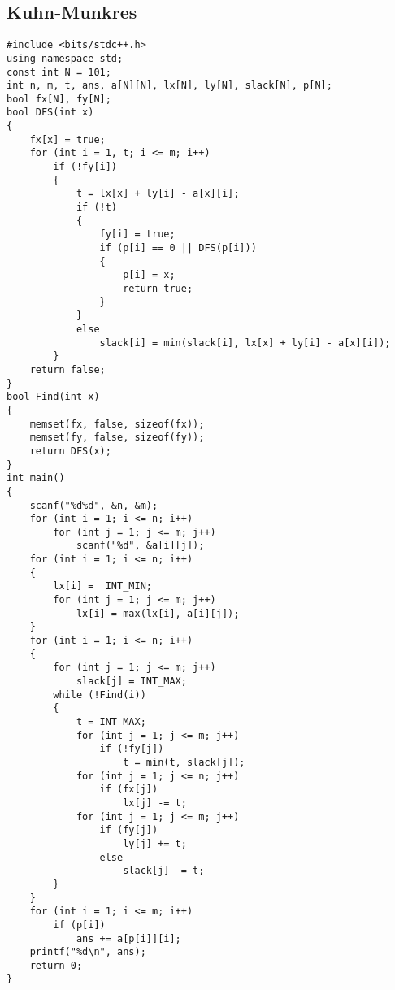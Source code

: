 \documentclass[a4paper]{article}
\begin{document}
\subsection{Kuhn-Munkres}
\begin{lstlisting}
#include <bits/stdc++.h>
using namespace std;
const int N = 101;
int n, m, t, ans, a[N][N], lx[N], ly[N], slack[N], p[N];
bool fx[N], fy[N];
bool DFS(int x)
{
    fx[x] = true;
    for (int i = 1, t; i <= m; i++)
        if (!fy[i])
        {
            t = lx[x] + ly[i] - a[x][i];
            if (!t)
            {
                fy[i] = true;
                if (p[i] == 0 || DFS(p[i]))
                {
                    p[i] = x;
                    return true;
                }
            }
            else
                slack[i] = min(slack[i], lx[x] + ly[i] - a[x][i]);
        }
    return false;
}
bool Find(int x)
{
    memset(fx, false, sizeof(fx));
    memset(fy, false, sizeof(fy));
    return DFS(x);
}
int main()
{
    scanf("%d%d", &n, &m);
    for (int i = 1; i <= n; i++)
        for (int j = 1; j <= m; j++)
            scanf("%d", &a[i][j]);
    for (int i = 1; i <= n; i++)
    {
        lx[i] =  INT_MIN;
        for (int j = 1; j <= m; j++)
            lx[i] = max(lx[i], a[i][j]);
    }
    for (int i = 1; i <= n; i++)
    {
        for (int j = 1; j <= m; j++)
            slack[j] = INT_MAX;
        while (!Find(i))
        {
            t = INT_MAX;
            for (int j = 1; j <= m; j++)
                if (!fy[j])
                    t = min(t, slack[j]);
            for (int j = 1; j <= n; j++)
                if (fx[j])
                    lx[j] -= t;
            for (int j = 1; j <= m; j++)
                if (fy[j])
                    ly[j] += t;
                else
                    slack[j] -= t;
        }
    }
    for (int i = 1; i <= m; i++)
        if (p[i])
            ans += a[p[i]][i];
    printf("%d\n", ans);
    return 0;
}
\end{lstlisting}
\end{document}
